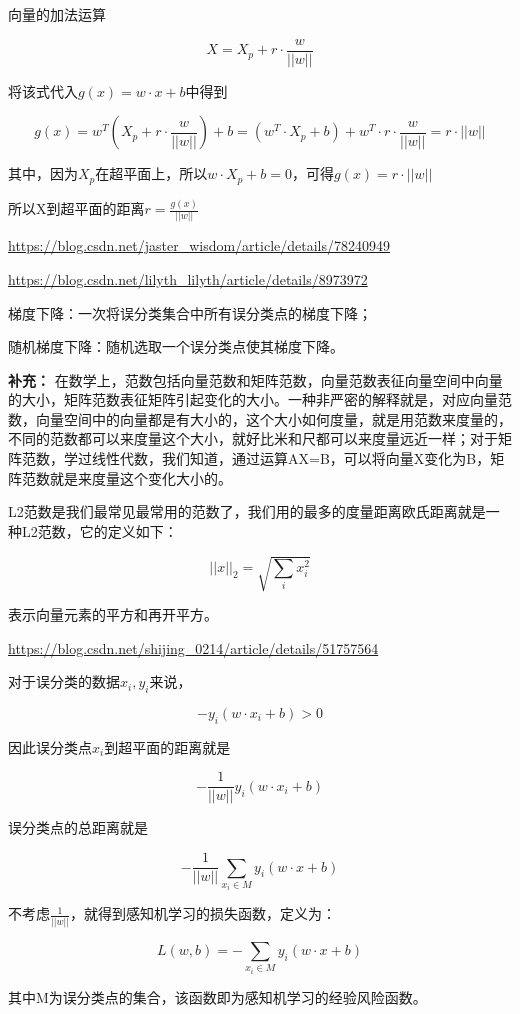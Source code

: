 \documentclass{ctexart}
\begin{document}
	向量的加法运算
	
	\[X = X_p + r · \frac{w}{||w||}\]
	
	将该式代入\(g(x) = w·x + b\)中得到
	
	\[g(x) = w^T(X_p + r · \frac{w}{||w||}) + b = (w^T·X_p + b) + w^T·r·\frac{w}{||w||} = r·||w||\]
	
	其中，因为\(X_p\)在超平面上，所以\(w·X_p + b = 0\)，可得\(g(x) = r·||w||\)
	
	所以X到超平面的距离\(r = \frac{g(x)}{||w||}\)
	
	\url{https://blog.csdn.net/jaster_wisdom/article/details/78240949}
	
	\url{https://blog.csdn.net/lilyth_lilyth/article/details/8973972}
	
	梯度下降：一次将误分类集合中所有误分类点的梯度下降；
	
	随机梯度下降：随机选取一个误分类点使其梯度下降。	
	
	\mbox{}
	
	\textbf{补充：} 在数学上，范数包括向量范数和矩阵范数，向量范数表征向量空间中向量的大小，矩阵范数表征矩阵引起变化的大小。一种非严密的解释就是，对应向量范数，向量空间中的向量都是有大小的，这个大小如何度量，就是用范数来度量的，不同的范数都可以来度量这个大小，就好比米和尺都可以来度量远近一样；对于矩阵范数，学过线性代数，我们知道，通过运算AX=B，可以将向量X变化为B，矩阵范数就是来度量这个变化大小的。
	
	L2范数是我们最常见最常用的范数了，我们用的最多的度量距离欧氏距离就是一种L2范数，它的定义如下：
	
	\[||x||_2 = \sqrt{\sum_{i}x_i^2}\]
	
	表示向量元素的平方和再开平方。
	
	\url{https://blog.csdn.net/shijing_0214/article/details/51757564}
	
	\mbox{}
	
	对于误分类的数据\(x_i, y_i\)来说，
	
	\[-y_i(w·x_i + b) > 0\]

	因此误分类点\(x_i\)到超平面的距离就是
	
	\[-\frac{1}{||w||}y_i(w·x_i + b)\]	
	
	误分类点的总距离就是
	
	\[-\frac{1}{||w||}\sum_{x_i \in M}y_i(w·x + b)\]
	
	不考虑\(\frac{1}{||w||}\)，就得到感知机学习的损失函数，定义为：
	
	\[L(w, b) = -\sum_{x_i \in M}y_i(w·x + b)\]
	
	其中M为误分类点的集合，该函数即为感知机学习的经验风险函数。
	
\end{document}
